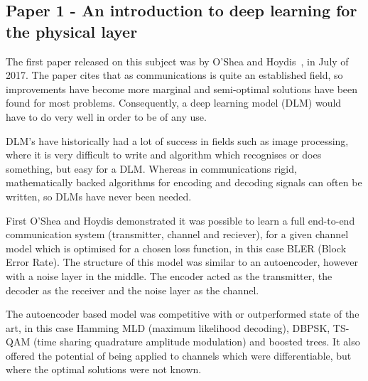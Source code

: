 \documentclass[12pt,onecolumn,letterpaper]{article}
\begin{document}
\subsection{Paper 1 - An introduction to deep learning for the physical layer}

The first paper released on this subject was by O'Shea and Hoydis~\cite{oShea}, in July of 2017. The paper cites that as communications is quite an established field, so improvements have become more marginal and semi-optimal solutions have been found for most problems. Consequently, a deep learning model (DLM) would have to do very well in order to be of any use. 

DLM’s have historically had a lot of success in fields such as image processing, where it is very difficult to write and algorithm which recognises or does something, but easy for a DLM. Whereas in communications rigid, mathematically backed algorithms for encoding and decoding signals can often be written, so DLMs have never been needed.

First O'Shea and Hoydis demonstrated it was possible to learn a full end-to-end communication system (transmitter, channel and reciever), for a given channel model which is optimised for a chosen loss function, in this case BLER (Block Error Rate). The structure of this model was similar to an autoencoder, however with a noise layer in the middle. The encoder acted as the transmitter, the decoder as the receiver and the noise layer as the channel.

The autoencoder based model was competitive with or outperformed state of the art, in this case Hamming MLD (maximum likelihood decoding), DBPSK, TS-QAM (time sharing quadrature amplitude modulation) and boosted trees. It also offered the potential of being applied to channels which were differentiable, but where the optimal solutions were not known. 
\end{document}
